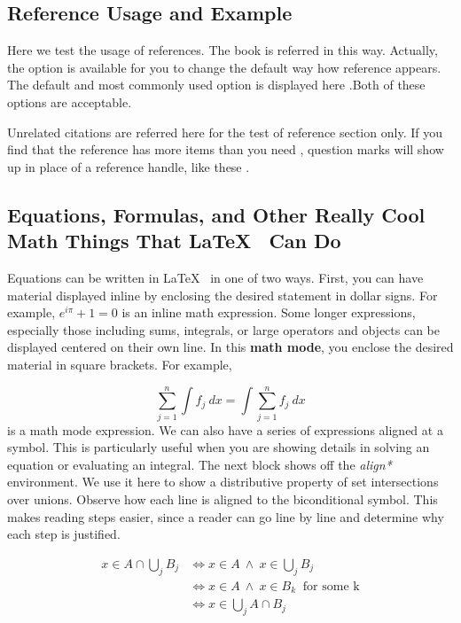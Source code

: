 \subsection{Reference Usage and Example}

Here we test the usage of references. The book\cite{REALCAR}
is referred in this way. Actually, the option is available for you to change the default way how reference appears. The default and most commonly used option \cite{einstein} is displayed here \cite{Barn-JORVQ}.Both of these options are acceptable.

Unrelated citations are referred here for the test of reference section only\cite{TAMU}. If you
find that the reference \cite{GIGEM} has more items than you need \cite{WAGFJ}, question marks will show up in place of a reference handle, like these \cite{Over9000}.

\subsection{Equations, Formulas, and Other Really Cool Math Things That \LaTeX ~ Can Do}

Equations can be written in \LaTeX ~ in one of two ways. First, you can have material displayed inline by enclosing the desired statement in dollar signs. For example, $e^{i\pi}+1=0$ is an inline math expression. Some longer expressions, especially those including sums, integrals, or large operators and objects can be displayed centered on their own line. In this \textbf{math mode}, you enclose the desired material in square brackets. For example,

\[ \sum_{j = 1} ^n \int f_j \ dx = \int \sum_{j = 1} ^n f_j \ dx \]
is a math mode expression. We can also have a series of expressions aligned at a symbol. This is particularly useful when you are showing details in solving an equation or evaluating an integral. The next block shows off the \textit{align*} environment. We use it here to show a distributive property of set intersections over unions. Observe how each line is aligned to the biconditional symbol. This makes reading steps easier, since a reader can go line by line and determine why each step is justified.

\begin{align*}
	x \in A \cap \bigcup_{j} B_j & \iff x \in A \ \wedge \ x \in \bigcup_{j} B_j          \\
	                             & \iff x \in A \ \wedge \ x \in B_k \ \text{ for some k} \\
	                             & \iff x \in \bigcup_{j} A \cap B_j
\end{align*}


